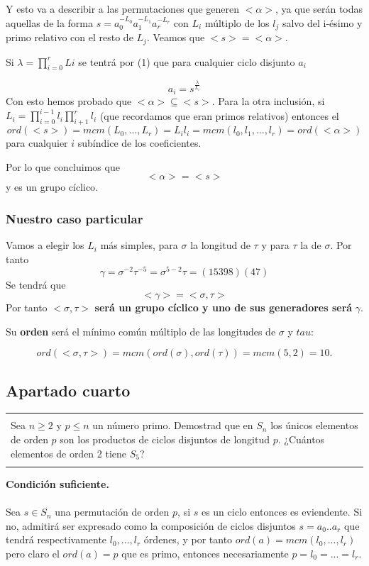 \documentclass[12pt]{article}
\newenvironment{micaja}
{
    \begin{center}
    \begin{tabular}{|p{0.9\textwidth}|}
    \hline\\
    }   
    {   
    \\\\\hline
    \end{tabular} 
    \end{center}
    }
\begin{document}
Y esto va a describir a las permutaciones que generen $<\alpha>$, 
ya que serán todas aquellas de la forma $s = a_0^{-L_0} a_1^{-L_1} a_r^{-L_r}$
con $L_i$ múltiplo de los $l_j$ salvo del i-ésimo y primo relativo con el resto de $L_j.$
Veamos que $<s> = <\alpha>.$

Si $\lambda = \prod_{i=0}^r Li$ se tentrá por (1) que para cualquier ciclo disjunto $a_i$

$$ a_i = s^{\frac{\lambda}{L_i}}$$
Con esto hemos probado que $<\alpha> \subseteq <s>.$ Para la otra inclusión, si 
$L_i= \prod_{i=0}^{i-1} l_i \prod_{i+1}^r l_i$ (que recordamos que eran primos relativos)
entonces el 
$$ord(<s>)= mcm(L_0,..., L_r) = L_i l_i = mcm(l_0, l_1,..., l_r) = ord(<\alpha>)$$
para cualquier $i$ subíndice de los coeficientes. 

Por lo que concluimos que $$<\alpha> = <s>$$ y es un grupo cíclico. 

\subsubsection*{Nuestro caso particular}
Vamos a elegir los $L_i$ más simples, para $\sigma$ la longitud de $\tau$ y para 
$\tau$ la de $\sigma.$ 
Por tanto 
 $$\gamma = \sigma ^{-2} \tau ^{-5} = \sigma^{5-2}\tau  = (1 5 3 9 8)(4 7)$$ 
 Se tendrá que 
 $$<\gamma> = < \sigma, \tau>$$ Por tanto $< \sigma, \tau>$ \textbf{ será un grupo cíclico 
 y uno de sus generadores será} $\gamma.$
 
 Su \textbf{orden} será el mínimo común múltiplo de las longitudes de $\sigma$ y $tau$: 

 $$ord(< \sigma, \tau>) = mcm(ord(\sigma), ord(\tau)) = mcm (5,2) = 10.$$

\subsection{Apartado cuarto}

\begin{micaja}
    Sea $n \geq 2$ y $p \leq n$ un número primo. Demostrad que en $S_n$ los únicos elementos
    de orden $p$ son los productos de ciclos disjuntos de longitud $p.$ ¿Cuántos elementos de orden
    2 tiene $S_5$?
\end{micaja}


\textbf{Condición suficiente.}\paragraph{}
 Sea $s \in S_n$  una permutación de orden $p$, si $s$ es un ciclo entonces es eviendente. 
 Si no, admitirá ser expresado como la composición de ciclos disjuntos $s = a_0..a_r$ que 
 tendrá respectivamente $l_0, ..., l_r$ órdenes, y por tanto $ord(a) = mcm(l_0,...,l_r)$
 pero claro el $ord(a) = p$ que es primo, entonces necesariamente $p = l_0 = ... = l_r.$ 
\end{document}
